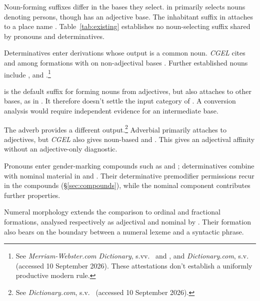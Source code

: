 \documentclass[12pt]{article}
\begin{document}
Noun-forming suffixes differ in the bases they select.  in  primarily selects nouns denoting persons, though  has an adjective base. The inhabitant suffix  in  attaches to a place name \citep[Ch.~19, §§5.6.2(b), 5.7.2(k)]{huddleston2002}. Table~\ref{tab:existing} establishes no noun-selecting suffix shared by pronouns and determinatives.

Determinatives enter derivations whose output is a common noun. \textit{CGEL} cites  and  among formations with  on non-adjectival bases \citep[Ch.~19, §5.7.2(i)]{huddleston2002}. Further established nouns include ,  and .\footnote{See \textit{Merriam-Webster.com Dictionary}, s.vv.\ \href{https://www.merriam-webster.com/dictionary/thisness}{} and \href{https://www.merriam-webster.com/dictionary/fewness}{}, and \textit{Dictionary.com}, s.v.\ \href{https://www.dictionary.com/browse/muchness}{} (accessed 10 September 2026). These attestations don't establish a uniformly productive modern rule.}

 is the default suffix for forming nouns from adjectives, but also attaches to other bases, as in  \citep[Ch.~19, §5.7.2(i)]{huddleston2002}. It therefore doesn't settle the input category of . A conversion analysis would require independent evidence for an intermediate base.

The adverb  provides a different output.\footnote{See \textit{Dictionary.com}, s.v.\ \href{https://www.dictionary.com/browse/mostly}{} (accessed 10 September 2026).} Adverbial  primarily attaches to adjectives, but \textit{CGEL} also gives noun-based  and  \citep[566]{huddleston2002}. This gives  an adjectival affinity without an adjective-only diagnostic.

Pronouns enter gender-marking compounds such as  and  \citep[Ch.~19, §5.3]{huddleston2002}; determinatives combine with nominal material in  and . Their determinative premodifier permissions recur in the compounds (§\ref{sec:compounds}), while the nominal component contributes further properties.

Numeral morphology extends the comparison to ordinal and fractional formations, analysed respectively as adjectival and nominal by \textcite{reynolds2026numerals}. Their formation also bears on the boundary between a numeral lexeme and a syntactic phrase.
\end{document}
